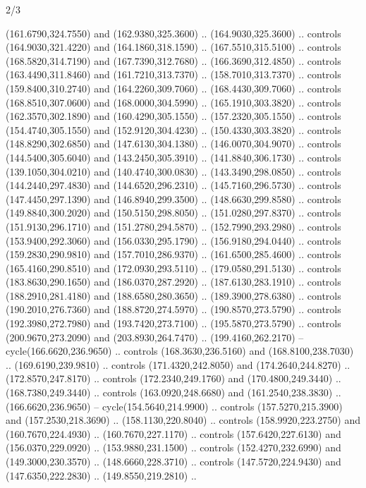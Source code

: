 \begin{flagdescription}{2/3}
\begin{scope}[shift={(0.5\flaglength,0.5)},scale=\flagwidth/480]
\begin{scope}[y=0.8pt, x=0.80pt, yscale=-1,shift={(-450,-300)}]
\begin{scope}[cm={{1.02948,0.0,0.0,1.02948,(-13.26599,6.99414)}}]
\begin{scope}[shift={(341.0917,90.34325)}]
  (161.6790,324.7550) and (162.9380,325.3600) .. (164.9030,325.3600) .. controls
  (164.9030,321.4220) and (164.1860,318.1590) .. (167.5510,315.5100) .. controls
  (168.5820,314.7190) and (167.7390,312.7680) .. (166.3690,312.4850) .. controls
  (163.4490,311.8460) and (161.7210,313.7370) .. (158.7010,313.7370) .. controls
  (159.8400,310.2740) and (164.2260,309.7060) .. (168.4430,309.7060) .. controls
  (168.8510,307.0600) and (168.0000,304.5990) .. (165.1910,303.3820) .. controls
  (162.3570,302.1890) and (160.4290,305.1550) .. (157.2320,305.1550) .. controls
  (154.4740,305.1550) and (152.9120,304.4230) .. (150.4330,303.3820) .. controls
  (148.8290,302.6850) and (147.6130,304.1380) .. (146.0070,304.9070) .. controls
  (144.5400,305.6040) and (143.2450,305.3910) .. (141.8840,306.1730) .. controls
  (139.1050,304.0210) and (140.4740,300.0830) .. (143.3490,298.0850) .. controls
  (144.2440,297.4830) and (144.6520,296.2310) .. (145.7160,296.5730) .. controls
  (147.4450,297.1390) and (146.8940,299.3500) .. (148.6630,299.8580) .. controls
  (149.8840,300.2020) and (150.5150,298.8050) .. (151.0280,297.8370) .. controls
  (151.9130,296.1710) and (151.2780,294.5870) .. (152.7990,293.2980) .. controls
  (153.9400,292.3060) and (156.0330,295.1790) .. (156.9180,294.0440) .. controls
  (159.2830,290.9810) and (157.7010,286.9370) .. (161.6500,285.4600) .. controls
  (165.4160,290.8510) and (172.0930,293.5110) .. (179.0580,291.5130) .. controls
  (183.8630,290.1650) and (186.0370,287.2920) .. (187.6130,283.1910) .. controls
  (188.2910,281.4180) and (188.6580,280.3650) .. (189.3900,278.6380) .. controls
  (190.2010,276.7360) and (188.8720,274.5970) .. (190.8570,273.5790) .. controls
  (192.3980,272.7980) and (193.7420,273.7100) .. (195.5870,273.5790) .. controls
  (200.9670,273.2090) and (203.8930,264.7470) .. (199.4160,262.2170) --
  cycle(166.6620,236.9650) .. controls (168.3630,236.5160) and
  (168.8100,238.7030) .. (169.6190,239.9810) .. controls (171.4320,242.8050) and
  (174.2640,244.8270) .. (172.8570,247.8170) .. controls (172.2340,249.1760) and
  (170.4800,249.3440) .. (168.7380,249.3440) .. controls (163.0920,248.6680) and
  (161.2540,238.3830) .. (166.6620,236.9650) -- cycle(154.5640,214.9900) ..
  controls (157.5270,215.3900) and (157.2530,218.3690) .. (158.1130,220.8040) ..
  controls (158.9920,223.2750) and (160.7670,224.4930) .. (160.7670,227.1170) ..
  controls (157.6420,227.6130) and (156.0370,229.0920) .. (153.9880,231.1500) ..
  controls (152.4270,232.6990) and (149.3000,230.3570) .. (148.6660,228.3710) ..
  controls (147.5720,224.9430) and (147.6350,222.2830) .. (149.8550,219.2810) ..

\end{scope}
\end{scope}
\end{scope}
\end{scope}
\end{flagdescription}
